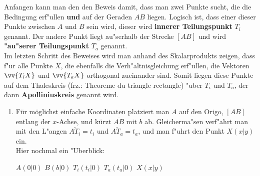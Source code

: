 \begin{\small}
\begin{Beweis}
\begin{small}
  Anfangen kann man den den Beweis damit, dass man zwei Punkte sucht, die die Bedingung erf"ullen \textbf{und} auf der Geraden $AB$ liegen. Logisch ist, dass einer dieser Punkte zwischen $A$ und $B$ sein wird, dieser wird \textbf{innerer Teilungspunkt} $T_{i}$ genannt. Der andere Punkt liegt au"serhalb der Strecke $[AB]$ und wird \textbf{"au"serer Teilungspunkt} $T_{a}$ genannt. \\
  Im letzten Schritt des Beweises wird man anhand des Skalarprodukts zeigen, dass f"ur alle Punkte $X$, die ebenfalls die Verh"altnisgleichung erf"ullen, die Vektoren $\vv{T_{i}X}$ und $\vv{T_{a}X}$ orthogonal zueinander sind. Somit liegen diese Punkte auf dem Thaleskreis (frz.: Theoreme du triangle rectangle) "uber $T_{i}$ und $T_{a}$, der dann \textbf{Apolliniuskreis} genannt wird.\\
\end{small}
\begin{enumerate}
  \item
  Für möglichst einfache Koordinaten platziert man $A$ auf den Origo, $[AB]$ entlang der $x$-Achse, und kürzt $\overline{AB}$ mit $b$ ab. Gleicherma"sen verf"ahrt man mit den L"angen $\overline{AT_{i}}=t_{i}$ und $\overline{AT_{a}}= t_{a}$, und man f"uhrt den Punkt $X(x|y)$ ein.\\
  Hier nochmal ein "Uberblick:
  \begin{center}
    \vartriangleright $A(0|0)$ \qquad \vartriangleright $B(b|0)$ \qquad \vartriangleright $T_{i}(t_{i}|0)$ \qquad \vartriangleright $T_{a}(t_{a}|0)$ \qquad \vartriangleright $X(x|y)$
  \end{center}


\end{enumerate}
\end{Beweis}
\end{\small}
